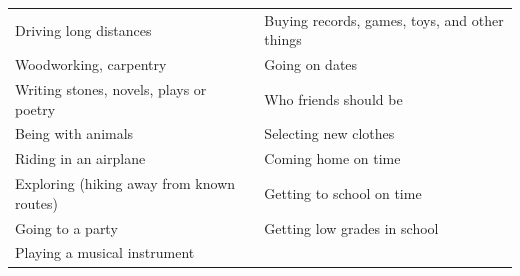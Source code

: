 \documentclass[]{book}
\begin{document}
\begin{longtable}[]{@{}ll@{}}
\begin{minipage}[t]{0.50\columnwidth}
Driving long distances\strut
\end{minipage} & \begin{minipage}[t]{0.44\columnwidth}\raggedright
Buying records, games, toys, and other things\strut
\end{minipage}\tabularnewline
\begin{minipage}[t]{0.50\columnwidth}\raggedright
Woodworking, carpentry\strut
\end{minipage} & \begin{minipage}[t]{0.44\columnwidth}\raggedright
Going on dates\strut
\end{minipage}\tabularnewline
\begin{minipage}[t]{0.50\columnwidth}\raggedright
Writing stones, novels, plays or poetry\strut
\end{minipage} & \begin{minipage}[t]{0.44\columnwidth}\raggedright
Who friends should be\strut
\end{minipage}\tabularnewline
\begin{minipage}[t]{0.50\columnwidth}\raggedright
Being with animals\strut
\end{minipage} & \begin{minipage}[t]{0.44\columnwidth}\raggedright
Selecting new clothes\strut
\end{minipage}\tabularnewline
\begin{minipage}[t]{0.50\columnwidth}\raggedright
Riding in an airplane\strut
\end{minipage} & \begin{minipage}[t]{0.44\columnwidth}\raggedright
Coming home on time\strut
\end{minipage}\tabularnewline
\begin{minipage}[t]{0.50\columnwidth}\raggedright
Exploring (hiking away from known routes)\strut
\end{minipage} & \begin{minipage}[t]{0.44\columnwidth}\raggedright
Getting to school on time\strut
\end{minipage}\tabularnewline
\begin{minipage}[t]{0.50\columnwidth}\raggedright
Going to a party\strut
\end{minipage} & \begin{minipage}[t]{0.44\columnwidth}\raggedright
Getting low grades in school\strut
\end{minipage}\tabularnewline
\begin{minipage}[t]{0.50\columnwidth}\raggedright
Playing a musical instrument\strut

\end{minipage}
\end{longtable}
\end{document}
